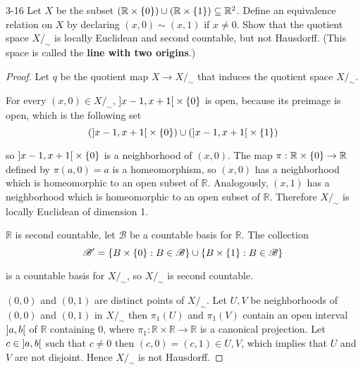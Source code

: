 \begin{problem}{3-16}
Let $X$ be the subset $(\mathbb{R}\times\left\{{0}\right\}) \cup (\mathbb{R}\times\left\{{1}\right\}) \subseteq \mathbb{R}^{2}$. Define an equivalence relation on $X$ by declaring $(x, 0) \sim (x, 1)$ if $x\ne 0$. Show that the quotient space $X/_{\sim}$ is locally Euclidean and second countable, but not Hausdorff. (This space is called the \textbf{line with two origins}.)
\end{problem}

\begin{proof}
	Let $q$ be the quotient map $X\to X/_{\sim}$ that induces the quotient space $X/_{\sim}$.

	For every $(x, 0) \in X/_{\sim}$, $\left]{x - 1, x + 1}\right[ \times \left\{{0}\right\}$ is open, because its preimage is open, which is the following set
	\begin{equation*}
		(\left]{x - 1, x + 1}\right[ \times \left\{{0}\right\}) \cup (\left]{x - 1, x + 1}\right[ \times \left\{{1}\right\})
	\end{equation*}

	so $\left]{x - 1, x + 1}\right[ \times \left\{{0}\right\}$ is a neighborhood of $(x, 0)$. The map $\pi: \mathbb{R} \times \left\{{0}\right\} \to \mathbb{R}$ defined by $\pi(a, 0) = a$ is a homeomorphism, so $(x, 0)$ has a neighborhood which is homeomorphic to an open subset of $\mathbb{R}$. Analogously, $(x, 1)$ has a neighborhood which is homeomorphic to an open subset of $\mathbb{R}$. Therefore $X/_{\sim}$ is locally Euclidean of dimension 1.

	$\mathbb{R}$ is second countable, let $\mathscr{B}$ be a countable basis for $\mathbb{R}$. The collection
	\begin{equation*}
		\mathscr{B'} = \left\{{ B \times\left\{{0}\right\} : B\in\mathscr{B} }\right\} \cup \left\{{ B \times\left\{{1}\right\} : B\in\mathscr{B} }\right\}
	\end{equation*}

	is a countable basis for $X/_{\sim}$, so $X/_{\sim}$ is second countable.

	$(0, 0)$ and $(0, 1)$ are distinct points of $X/_{\sim}$. Let $U, V$ be neighborhoods of $(0, 0)$ and $(0, 1)$ in $X/_{\sim}$ then $\pi_{1}(U)$ and $\pi_{1}(V)$ contain an open interval $\left]{a, b}\right[$ of $\mathbb{R}$ containing $0$, where $\pi_{1}: \mathbb{R}\times\mathbb{R} \to \mathbb{R}$ is a canonical projection. Let $c\in \left]{a, b}\right[$ such that $c\ne 0$ then $(c, 0) = (c, 1) \in U, V$, which implies that $U$ and $V$ are not disjoint. Hence $X/_{\sim}$ is not Hausdorff.
\end{proof}

